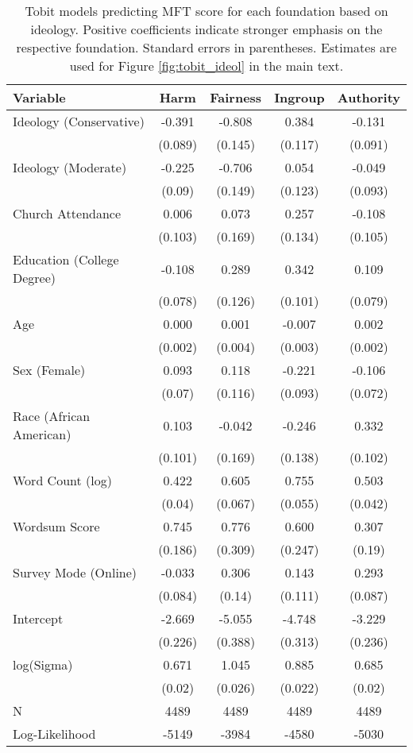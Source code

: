 \begin{table}[ht]
\centering
\caption{Tobit models predicting MFT score for each foundation based 
           on ideology. Positive coefficients indicate stronger emphasis on the respective 
           foundation. Standard errors in parentheses. Estimates are used for Figure 
           \ref{fig:tobit_ideol} in the main text.} 
\label{tab:tobit_ideol}
\begingroup\footnotesize
\begin{tabular}{lcccc}
  \hline
Variable & Harm & Fairness & Ingroup & Authority \\ 
  \hline
Ideology (Conservative) & -0.391 & -0.808 &  0.384 & -0.131 \\ 
   & (0.089) & (0.145) & (0.117) & (0.091) \\ 
  Ideology (Moderate) & -0.225 & -0.706 &  0.054 & -0.049 \\ 
   & (0.09) & (0.149) & (0.123) & (0.093) \\ 
  Church Attendance &  0.006 &  0.073 &  0.257 & -0.108 \\ 
   & (0.103) & (0.169) & (0.134) & (0.105) \\ 
  Education (College Degree) & -0.108 &  0.289 &  0.342 &  0.109 \\ 
   & (0.078) & (0.126) & (0.101) & (0.079) \\ 
  Age &  0.000 &  0.001 & -0.007 &  0.002 \\ 
   & (0.002) & (0.004) & (0.003) & (0.002) \\ 
  Sex (Female) &  0.093 &  0.118 & -0.221 & -0.106 \\ 
   & (0.07) & (0.116) & (0.093) & (0.072) \\ 
  Race (African American) &  0.103 & -0.042 & -0.246 &  0.332 \\ 
   & (0.101) & (0.169) & (0.138) & (0.102) \\ 
  Word Count (log) &  0.422 &  0.605 &  0.755 &  0.503 \\ 
   & (0.04) & (0.067) & (0.055) & (0.042) \\ 
  Wordsum Score &  0.745 &  0.776 &  0.600 &  0.307 \\ 
   & (0.186) & (0.309) & (0.247) & (0.19) \\ 
  Survey Mode (Online) & -0.033 &  0.306 &  0.143 &  0.293 \\ 
   & (0.084) & (0.14) & (0.111) & (0.087) \\ 
  Intercept & -2.669 & -5.055 & -4.748 & -3.229 \\ 
   & (0.226) & (0.388) & (0.313) & (0.236) \\ 
  log(Sigma) &  0.671 &  1.045 &  0.885 &  0.685 \\ 
   & (0.02) & (0.026) & (0.022) & (0.02) \\ 
   \hline
N & 4489 & 4489 & 4489 & 4489 \\ 
  Log-Likelihood & -5149 & -3984 & -4580 & -5030 \\ 
   \hline
\end{tabular}
\endgroup
\end{table}
